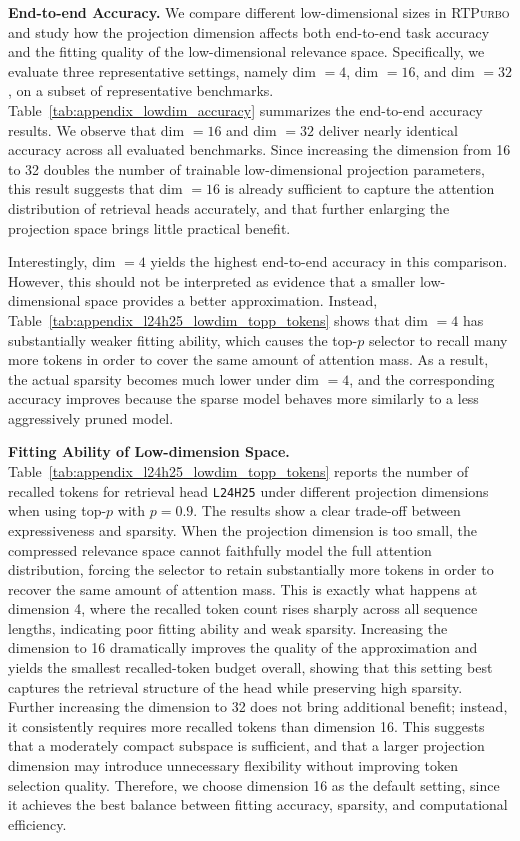 \documentclass{llmxive}
\providecommand{\name}{{\textsc{RTPurbo}}\xspace}
\begin{document}

\noindent\textbf{End-to-end Accuracy.} We compare different low-dimensional sizes in \name and study how the projection dimension affects both end-to-end task accuracy and the fitting quality of the low-dimensional relevance space. Specifically, we evaluate three representative settings, namely dim $=4$, dim $=16$, and dim $=32$, on a subset of representative benchmarks. Table~\ref{tab:appendix_lowdim_accuracy} summarizes the end-to-end accuracy results. We observe that dim $=16$ and dim $=32$ deliver nearly identical accuracy across all evaluated benchmarks. Since increasing the dimension from 16 to 32 doubles the number of trainable low-dimensional projection parameters, this result suggests that dim $=16$ is already sufficient to capture the attention distribution of retrieval heads accurately, and that further enlarging the projection space brings little practical benefit.

Interestingly, dim $=4$ yields the highest end-to-end accuracy in this comparison. However, this should not be interpreted as evidence that a smaller low-dimensional space provides a better approximation. Instead, Table~\ref{tab:appendix_l24h25_lowdim_topp_tokens} shows that dim $=4$ has substantially weaker fitting ability, which causes the top-$p$ selector to recall many more tokens in order to cover the same amount of attention mass. As a result, the actual sparsity becomes much lower under dim $=4$, and the corresponding accuracy improves because the sparse model behaves more similarly to a less aggressively pruned model.

\noindent\textbf{Fitting Ability of Low-dimension Space.} Table~\ref{tab:appendix_l24h25_lowdim_topp_tokens} reports the number of recalled tokens for retrieval head \texttt{L24H25} under different projection dimensions when using top-$p$ with $p=0.9$. The results show a clear trade-off between expressiveness and sparsity. When the projection dimension is too small, the compressed relevance space cannot faithfully model the full attention distribution, forcing the selector to retain substantially more tokens in order to recover the same amount of attention mass. This is exactly what happens at dimension 4, where the recalled token count rises sharply across all sequence lengths, indicating poor fitting ability and weak sparsity. Increasing the dimension to 16 dramatically improves the quality of the approximation and yields the smallest recalled-token budget overall, showing that this setting best captures the retrieval structure of the head while preserving high sparsity. Further increasing the dimension to 32 does not bring additional benefit; instead, it consistently requires more recalled tokens than dimension 16. This suggests that a moderately compact subspace is sufficient, and that a larger projection dimension may introduce unnecessary flexibility without improving token selection quality. Therefore, we choose dimension 16 as the default setting, since it achieves the best balance between fitting accuracy, sparsity, and computational efficiency.
\end{document}
